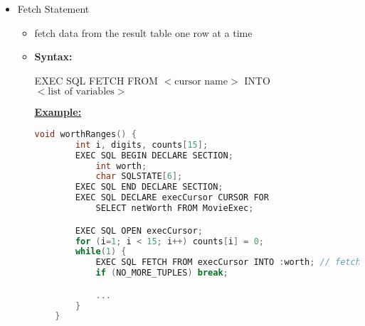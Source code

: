 \documentclass[12pt]{article}
\begin{document}
\begin{enumerate}[1.]
\begin{itemize}
\begin{itemize}
\begin{lstlisting}[language=python]
        sql_command = format_str.format(first=p[0], last=p[1], gender=p[2], birthdate = p[3])
        cursor.execute(sql_command)
    \end{lstlisting}
        \end{itemize}

        \item Fetch Statement
        \begin{itemize}
            \item fetch data from the result table one row at a time
            \item \textbf{Syntax:}

            EXEC SQL FETCH FROM $<\text{cursor name}>$ INTO $<\text{list of variables}>$

            \bigskip

            \underline{\textbf{Example:}}

            \bigskip

    \begin{lstlisting}[language=c]
    void worthRanges() {
        int i, digits, counts[15];
        EXEC SQL BEGIN DECLARE SECTION;
            int worth;
            char SQLSTATE[6];
        EXEC SQL END DECLARE SECTION;
        EXEC SQL DECLARE execCursor CURSOR FOR
            SELECT netWorth FROM MovieExec;

        EXEC SQL OPEN execCursor;
        for (i=1; i < 15; i++) counts[i] = 0;
        while(1) {
            EXEC SQL FETCH FROM execCursor INTO :worth; // fetches a row of value from movieExec and stores in worth
            if (NO_MORE_TUPLES) break;

            ...
        }
    }
    \end{lstlisting}

        \end{itemize}
    \end{itemize}
\end{enumerate}
\end{document}

